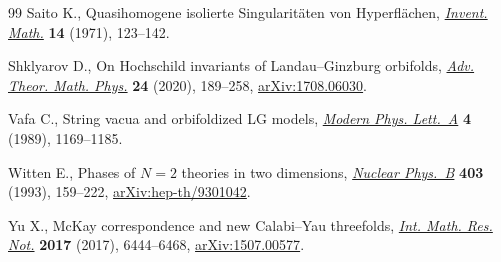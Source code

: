 \documentclass[pdftex]{sigma}
\numberwithin{equation}{section}
\begin{document}
\begin{thebibliography}{99}
Saito K., Quasihomogene isolierte {S}ingularit\"aten von {H}yperfl\"achen,
 \href{https://doi.org/10.1007/BF01405360}{\textit{Invent. Math.}} \textbf{14} (1971), 123--142.

Shklyarov D., On {H}ochschild invariants of {L}andau--{G}inzburg orbifolds,
 \href{https://doi.org/10.4310/ATMP.2020.v24.n1.a6}{\textit{Adv. Theor. Math. Phys.}} \textbf{24} (2020), 189--258,
 \href{https://arxiv.org/abs/1708.06030}{arXiv:1708.06030}.


Vafa C., String vacua and orbifoldized {LG} models, \href{https://doi.org/10.1142/S0217732389001350}{\textit{Modern Phys.
 Lett.~A}} \textbf{4} (1989), 1169--1185.

Witten E., Phases of {$N=2$} theories in two dimensions, \href{https://doi.org/10.1016/0550-3213(93)90033-L}{\textit{Nuclear
 Phys.~B}} \textbf{403} (1993), 159--222, \href{https://arxiv.org/abs/hep-th/9301042}{arXiv:hep-th/9301042}.

Yu X., Mc{K}ay correspondence and new {C}alabi--{Y}au threefolds, \href{https://doi.org/10.1093/imrn/rnv391}{\textit{Int.
 Math. Res. Not.}} \textbf{2017} (2017), 6444--6468, \href{https://arxiv.org/abs/1507.00577}{arXiv:1507.00577}.

\end{thebibliography}\LastPageEnding
\end{document}
